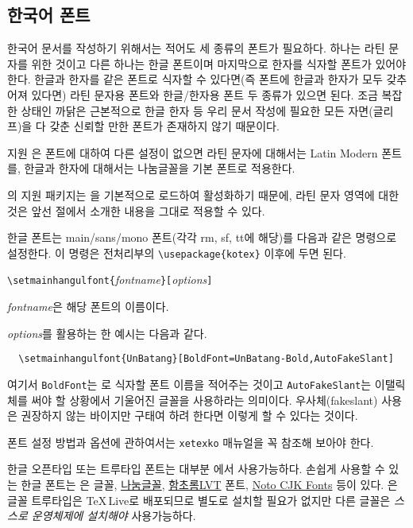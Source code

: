 \subsection{한국어 폰트}
\label{kofonts}

%
한국어 문서를 작성하기 위해서는 적어도 세 종류의 폰트가 필요하다. 하나는 라틴 문자를 위한 것이고 다른 하나는 한글 폰트이며 마지막으로 한자를 식자할 폰트가 있어야 한다. 
한글과 한자를 같은 폰트로 식자할 수 있다면(즉 폰트에 한글과 한자가 모두 갖추어져 있다면) 라틴 문자용 폰트와 한글/한자용 폰트 두 종류가 있으면 된다. 조금 복잡한 상태인 까닭은 근본적으로 한글 한자 등 우리 문서 작성에 필요한 모든 자면(글리프)을 다 갖춘 신뢰할 만한 폰트가 존재하지 않기 때문이다.

\XeLaTeX{} 지원 \koTeX 은 폰트에 대하여 다른 설정이 없으면 라틴 문자에 대해서는 Latin Modern 폰트를, 한글과 한자에 대해서는 나눔글꼴을 기본 폰트로 적용한다.

\koTeX 의 \XeLaTeX{} 지원 패키지는 을 기본적으로 로드하여 활성화하기 때문에, 라틴 문자 영역에 대한 것은 앞선 절에서 소개한 내용을 그대로 적용할 수 있다. 

한글 폰트는 main/sans/mono 폰트(각각 rm, sf, tt에 해당)를 다음과 같은 명령으로 설정한다. 이 명령은 전처리부의 \verb|\usepackage{kotex}| 이후에 두면 된다.
\begin{lscommand}
\verb|\setmainhangulfont{|\emph{fontname}\verb|}[|\emph{options}\verb|]|
\end{lscommand}
\noindent \emph{fontname}은 해당 폰트의 이름이다. 

\emph{options}를 활용하는 한 예시는 다음과 같다.
\begin{verbatim}
  \setmainhangulfont{UnBatang}[BoldFont=UnBatang-Bold,AutoFakeSlant]
\end{verbatim}
여기서 \verb|BoldFont|는 로 식자할 폰트 이름을 적어주는 것이고%
\verb|AutoFakeSlant|\allowbreak 는 이탤릭체를 써야 할 상황에서 기울어진 글꼴을 사용하라는 의미이다. 우사체(fakeslant)
사용은 권장하지 않는 바이지만 구태여 하려 한다면 이렇게 할 수 있다는 것이다.

폰트 설정 방법과 옵션에 관하여서는 \texttt{xetexko} 매뉴얼\cite{xetexko}을 꼭 참조해 보아야 한다.

한글 오픈타입 또는 트루타입 폰트는 대부분 \XeLaTeX 에서 사용가능하다.
손쉽게 사용할 수 있는 한글 폰트는 은 글꼴, 
\href{https://hangeul.naver.com}{나눔글꼴}, 
\href{http://wiki.ktug.org/wiki/wiki.php/%ED%95%A8%EC%B4%88%EB%A1%AC%EC%B2%B4LVT}{함초롬LVT} 폰트,
\href{https://www.google.com/get/noto/}{Noto CJK Fonts} 등이 있다.
은 글꼴 트루타입은 \TeX\,Live로 배포되므로 별도로 설치할 필요가 없지만 다른 글꼴은 \emph{스스로 운영체제에 설치해야} 사용가능하다.


